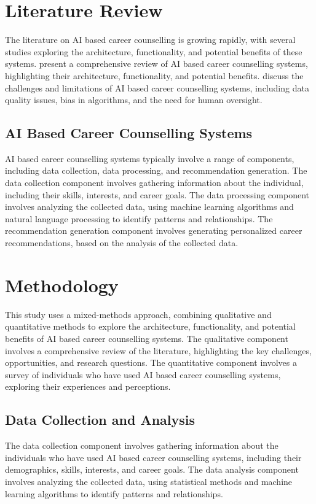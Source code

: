 \documentclass[12pt,a4paper]{article}
\begin{document}
\section{Literature Review}
The literature on AI based career counselling is growing rapidly, with several studies exploring the architecture, functionality, and potential benefits of these systems. \citet{patel2019} present a comprehensive review of AI based career counselling systems, highlighting their architecture, functionality, and potential benefits. \citet{sharma2020} discuss the challenges and limitations of AI based career counselling systems, including data quality issues, bias in algorithms, and the need for human oversight.

\subsection{AI Based Career Counselling Systems}
AI based career counselling systems typically involve a range of components, including data collection, data processing, and recommendation generation. The data collection component involves gathering information about the individual, including their skills, interests, and career goals. The data processing component involves analyzing the collected data, using machine learning algorithms and natural language processing to identify patterns and relationships. The recommendation generation component involves generating personalized career recommendations, based on the analysis of the collected data.

\section{Methodology}
This study uses a mixed-methods approach, combining qualitative and quantitative methods to explore the architecture, functionality, and potential benefits of AI based career counselling systems. The qualitative component involves a comprehensive review of the literature, highlighting the key challenges, opportunities, and research questions. The quantitative component involves a survey of individuals who have used AI based career counselling systems, exploring their experiences and perceptions.

\subsection{Data Collection and Analysis}
The data collection component involves gathering information about the individuals who have used AI based career counselling systems, including their demographics, skills, interests, and career goals. The data analysis component involves analyzing the collected data, using statistical methods and machine learning algorithms to identify patterns and relationships.
\end{document}
